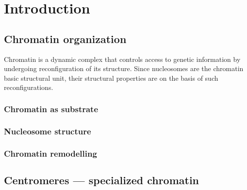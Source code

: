 \chapter{Introduction}
\label{ch:intro}








\section{Chromatin organization}
  Chromatin is a dynamic complex that controls access to genetic information by
  undergoing reconfiguration of its structure. Since nucleosomes are the chromatin
  basic structural unit, their structural properties are on the basis of such reconfigurations.

  \subsection{Chromatin as substrate}
  \subsection{Nucleosome structure}
  \subsection{Chromatin remodelling}

\section{Centromeres --- specialized chromatin}
